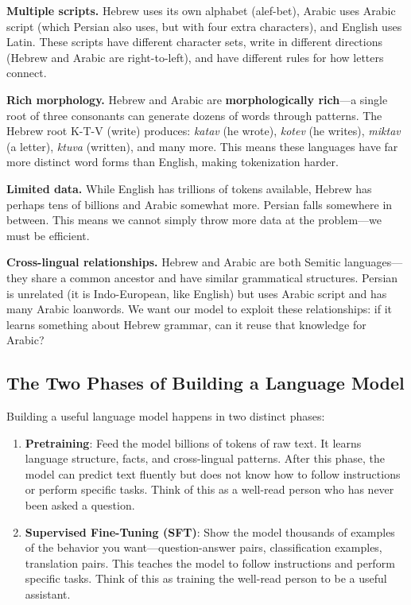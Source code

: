 \documentclass[11pt,a4paper]{article}
\begin{document}
\textbf{Multiple scripts.} Hebrew uses its own alphabet (alef-bet), Arabic uses Arabic script (which Persian also uses, but with four extra characters), and English uses Latin. These scripts have different character sets, write in different directions (Hebrew and Arabic are right-to-left), and have different rules for how letters connect.

\textbf{Rich morphology.} Hebrew and Arabic are \textbf{morphologically rich}---a single root of three consonants can generate dozens of words through patterns. The Hebrew root K-T-V (write) produces: \emph{katav} (he wrote), \emph{kotev} (he writes), \emph{miktav} (a letter), \emph{ktuva} (written), and many more. This means these languages have far more distinct word forms than English, making tokenization harder.

\textbf{Limited data.} While English has trillions of tokens available, Hebrew has perhaps tens of billions and Arabic somewhat more. Persian falls somewhere in between. This means we cannot simply throw more data at the problem---we must be efficient.

\textbf{Cross-lingual relationships.} Hebrew and Arabic are both Semitic languages---they share a common ancestor and have similar grammatical structures. Persian is unrelated (it is Indo-European, like English) but uses Arabic script and has many Arabic loanwords. We want our model to exploit these relationships: if it learns something about Hebrew grammar, can it reuse that knowledge for Arabic?

\subsection{The Two Phases of Building a Language Model}

Building a useful language model happens in two distinct phases:

\begin{enumerate}
    \item \textbf{Pretraining}: Feed the model billions of tokens of raw text. It learns language structure, facts, and cross-lingual patterns. After this phase, the model can predict text fluently but does not know how to follow instructions or perform specific tasks. Think of this as a well-read person who has never been asked a question.

    \item \textbf{Supervised Fine-Tuning (SFT)}: Show the model thousands of examples of the behavior you want---question-answer pairs, classification examples, translation pairs. This teaches the model to follow instructions and perform specific tasks. Think of this as training the well-read person to be a useful assistant.
\end{enumerate}
\end{document}
